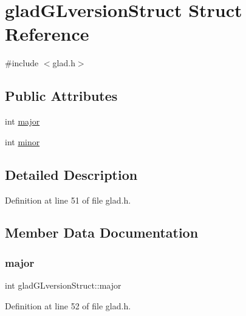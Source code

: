 \hypertarget{structglad_g_lversion_struct}{}\section{glad\+G\+Lversion\+Struct Struct Reference}
\label{structglad_g_lversion_struct}


{\ttfamily \#include $<$glad.\+h$>$}

\subsection*{Public Attributes}
\begin{DoxyCompactItemize}
\item 
int \mbox{\hyperlink{structglad_g_lversion_struct_ac7f9db11d2679df12ef0313b728554db}{major}}
\item 
int \mbox{\hyperlink{structglad_g_lversion_struct_acc2bff1c8966c6866f2ad6f5a4e475b2}{minor}}
\end{DoxyCompactItemize}


\subsection{Detailed Description}


Definition at line 51 of file glad.\+h.



\subsection{Member Data Documentation}
\mbox{\label{structglad_g_lversion_struct_ac7f9db11d2679df12ef0313b728554db}} 
\subsubsection{\texorpdfstring{major}{major}}
{\footnotesize\ttfamily int glad\+G\+Lversion\+Struct\+::major}



Definition at line 52 of file glad.\+h.

\mbox{\label{structglad_g_lversion_struct_acc2bff1c8966c6866f2ad6f5a4e475b2}} 
